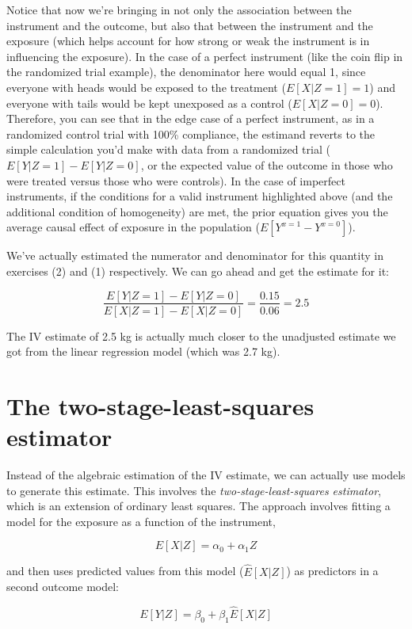 \documentclass[
]{book}
\begin{document}
Notice that now we're bringing in not only the association between the instrument
and the outcome, but also that between the instrument and the exposure (which
helps account for how strong or weak the instrument is in influencing the
exposure). In the case of a perfect instrument (like the coin flip in the
randomized trial example), the denominator here would equal 1, since
everyone with heads would be exposed to the treatment (\(E[X|Z=1] = 1\)) and
everyone with tails would be kept unexposed as a control (\(E[X|Z=0] = 0\)).
Therefore, you can see that in the edge case of a perfect instrument, as in
a randomized control trial with 100\% compliance, the estimand reverts to the simple calculation
you'd make with data from a randomized trial (\(E[Y|Z=1] - E[Y|Z=0]\), or the
expected value of the outcome in those who were treated versus those who were
controls).
In the case of imperfect instruments, if the conditions for a valid instrument highlighted above (and the additional condition of homogeneity) are met, the prior equation gives you the average causal effect of exposure in the population (\(E[Y^{x=1} - Y^{x=0}]\)).

We've actually estimated the numerator and denominator for this quantity in exercises (2) and (1) respectively. We can go ahead and get the estimate for it:

\[
\frac{E[Y|Z=1] - E[Y|Z=0]}{E[X|Z=1] - E[X|Z=0]}=\frac{0.15}{0.06} = 2.5 
\]

The IV estimate of 2.5 kg is actually much closer to the unadjusted estimate we got from the linear regression model (which was 2.7 kg).

\hypertarget{the-two-stage-least-squares-estimator}{%
\section{The two-stage-least-squares estimator}\label{the-two-stage-least-squares-estimator}}

Instead of the algebraic estimation of the IV estimate, we can actually use models to generate this estimate. This involves the \emph{two-stage-least-squares estimator}, which is an extension of ordinary least squares. The approach involves fitting a model for the exposure as a function of the instrument,

\[
E[X|Z] = \alpha_{0} + \alpha_{1}Z
\]

and then uses predicted values from this model (\(\hat{E}[X|Z]\)) as predictors in a second outcome model:

\[
E[Y|Z] = \beta_{0} + \beta_{1}\hat{E}[X|Z]
\]
\end{document}
